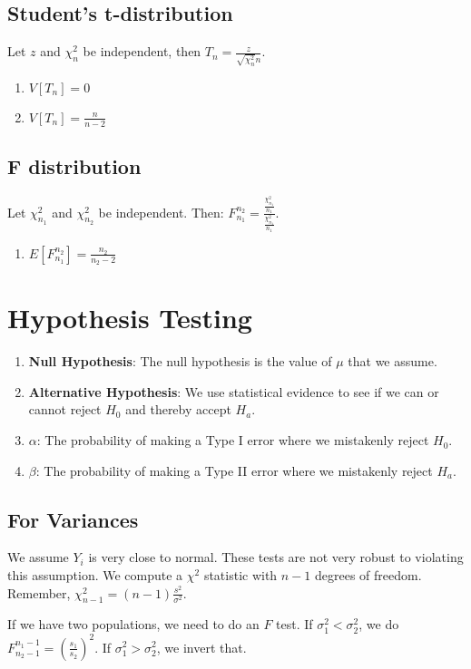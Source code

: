 \documentclass{article}
\begin{document}
\subsection{Student's t-distribution}
Let $z$ and $\chi_n^2$ be independent, then
$T_n = \frac{z}{\sqrt{\chi_n^2}{n}}$.
\begin{enumerate}
  \item $V[T_n] = 0$
  \item $V[T_n] = \frac{n}{n-2}$
\end{enumerate}

\subsection{F distribution}
Let $\chi_{n_1}^2$ and $\chi_{n_2}^2$ be independent. Then:
$F_{n_1}^{n_2} = \frac{\frac{\chi_{n_1}^2}{n_1}}{\frac{\chi_{n_1}^2}{n_1}}$.
\begin{enumerate}
  \item $E[F_{n_1}^{n_2}] = \frac{n_2}{n_2 - 2}$
\end{enumerate}

\section{Hypothesis Testing}

\begin{enumerate}
  \item {\bf Null Hypothesis}: The null hypothesis is the value of $\mu$ that we
    assume.
  \item {\bf Alternative Hypothesis}: We use statistical evidence to see if we
    can or cannot reject $H_0$ and thereby accept $H_a$.
  \item {\bf $\alpha$}: The probability of making a Type I error where we
    mistakenly reject $H_0$.
  \item {\bf $\beta$}: The probability of making a Type II error where we
    mistakenly reject $H_a$.
\end{enumerate}

\subsection{For Variances}
We assume $Y_i$ is very close to normal. These tests are not very robust to
violating this assumption. We compute a $\chi^2$ statistic with $n-1$ degrees
of freedom. Remember, $\chi^2_{n-1} = (n-1)\frac{s^2}{\sigma^2}$.

If we have two populations, we need to do an $F$ test. If
$\sigma_1^2<\sigma_2^2$, we do $F^{n_1-1}_{n_2-1}=(\frac{s_1}{s_2})^2$. If
$\sigma_1^2>\sigma_2^2$, we invert that.
\end{document}
